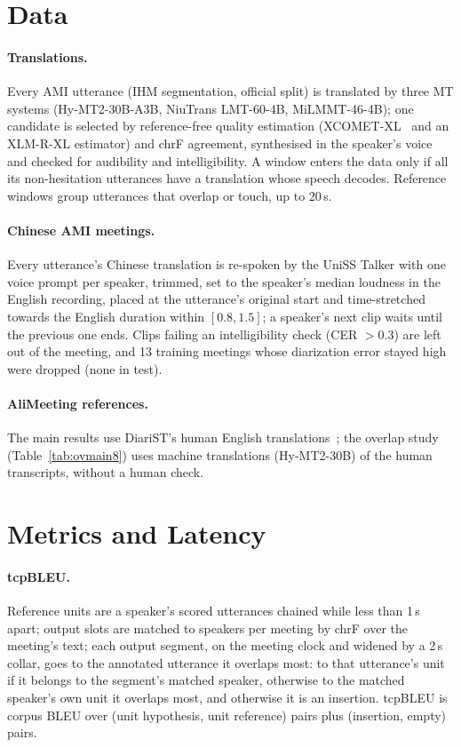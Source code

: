 \section{Data}
\label{app:data}



\paragraph{Translations.} Every AMI utterance (IHM segmentation, official split) is translated by three MT systems
(Hy-MT2-30B-A3B, NiuTrans LMT-60-4B, MiLMMT-46-4B); one candidate is selected by reference-free quality estimation
(XCOMET-XL~\citep{guerreiro2024xcomet} and an XLM-R-XL estimator) and chrF agreement, synthesised in the speaker's
voice and checked for audibility and intelligibility. A window enters the data only if all its non-hesitation
utterances have a translation whose speech decodes. Reference windows group utterances that overlap or touch, up to
20\,s.

\paragraph{Chinese AMI meetings.}\label{app:zhdata} Every utterance's Chinese translation is re-spoken by the UniSS Talker with one voice
prompt per speaker, trimmed, set to the speaker's median loudness in the English recording, placed at the utterance's
original start and time-stretched towards the English duration within $[0.8,1.5]$; a speaker's next clip waits until
the previous one ends. Clips failing an intelligibility check (CER $>0.3$) are left out of the meeting, and 13 training
meetings whose diarization error stayed high were dropped (none in test).

\paragraph{AliMeeting references.} The main results use DiariST's human English translations~\citep{yang2024diarist};
the overlap study (Table~\ref{tab:ovmain8}) uses machine translations (Hy-MT2-30B) of the human transcripts, without a human check.

\section{Metrics and Latency}
\label{app:metrics}
\label{app:chunk}

\paragraph{tcpBLEU.} Reference units are a speaker's scored utterances chained while less than 1\,s apart; output
slots are matched to speakers per meeting by chrF over the meeting's text; each output segment, on the meeting clock and
widened by a 2\,s collar, goes to the annotated utterance it overlaps most: to that utterance's unit if it belongs to the
segment's matched speaker, otherwise to the matched speaker's own unit it overlaps most, and otherwise it is an
insertion. tcpBLEU is corpus BLEU over (unit hypothesis, unit reference) pairs plus (insertion, empty) pairs.


